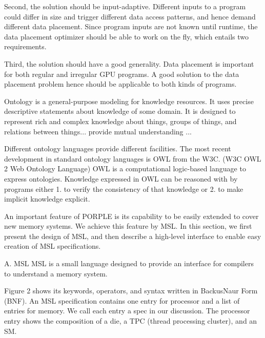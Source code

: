 \documentclass{sig-alternate}
\begin{document}
Second, the solution should be input-adaptive. Different inputs to a program could differ in size and trigger different data access patterns, and hence demand different data placement. Since program inputs are not known until runtime, the data placement optimizer should be able to work on the fly, which entails two requirements. 

Third, the solution should have a good generality. Data placement is important for both regular and irregular GPU programs. A good solution to the data placement problem hence should be applicable to both kinds of programs.  
 
Ontology \cite{ontology1, ontology2} is a general-purpose modeling for knowledge resources. It uses precise descriptive statements about knowledge of some domain. It is designed to represent rich and complex knowledge about things, groups of things, and relations between things... provide mutual understanding ... 

Different ontology languages provide different facilities. The most recent development in standard ontology languages is OWL from the W3C. (W3C OWL 2 Web Ontology Language)
OWL is a computational logic-based language to express ontologies. Knowledge expressed in OWL can be reasoned with by programs either 1. to verify the consistency of that knowledge or 2. to make implicit knowledge explicit.





An important feature of PORPLE is its capability to be easily extended to cover new memory systems. We achieve this feature by MSL. In this section, we first present the design of MSL, and then describe a high-level interface to enable easy creation of MSL specifications.

A. MSL
MSL is a small language designed to provide an interface for compilers to understand a memory system.

Figure 2 shows its keywords, operators, and syntax written in BackusNaur Form (BNF). An MSL specification contains one entry for processor and a list of entries for memory. We call each entry a spec in our discussion. The processor entry shows the composition of a die, a TPC (thread processing cluster), and an SM.
\end{document}
